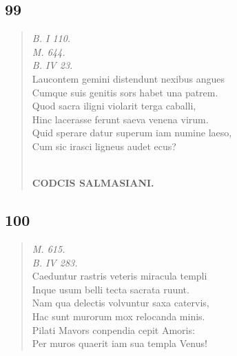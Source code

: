 \documentclass[11pt, a4paper]{report}
\begin{document}
            \subsection*{99}
      \begin{verse}
      \textit{B. I 110.} \\ \textit{M. 644.} \\ \textit{B. IV 23.} \\ Laucontem gemini distendunt nexibus angues \\ Cumque suis genitis sors habet una patrem. \\ Quod sacra iligni violarit terga caballi, \\ Hinc lacerasse ferunt saeva venena virum. \\ Quid sperare datur superum iam numine laeso, \\ Cum sic irasci ligneus audet ecus? \\ 
        ﻿\pagebreak 
    \begin{center} \textbf{CODCIS SALMASIANI.} \end{center} \marginpar{[125]} 
      \end{verse}
  
            \subsection*{100}
      \begin{verse}
      \textit{M. 615.} \\ \textit{B. IV 283.} \\ Caeduntur rastris veteris miracula templi \\ Inque usum belli tecta sacrata ruunt. \\ Nam qua delectis volvuntur saxa catervis, \\ Hac sunt murorum mox relocanda minis. \\ Pilati Mavors conpendia cepit Amoris: \\ Per muros quaerit iam sua templa Venus! \\ 
      \end{verse}
  
\end{document}
